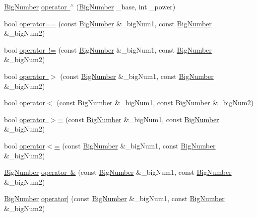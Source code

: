 \begin{DoxyCompactItemize}
\item 
\mbox{\hyperlink{class_big_nums_1_1_big_number}{Big\+Number}} \mbox{\hyperlink{namespace_big_nums_a26f4f7080ee4ac682138c92ad0ce7f75}{operator $^\wedge$}} (\mbox{\hyperlink{class_big_nums_1_1_big_number}{Big\+Number}} \+\_\+base, int \+\_\+power)
\item 
bool \mbox{\hyperlink{namespace_big_nums_a850a2334f2158f7bbe71d1c6e9fad531}{operator==}} (const \mbox{\hyperlink{class_big_nums_1_1_big_number}{Big\+Number}} \&\+\_\+big\+Num1, const \mbox{\hyperlink{class_big_nums_1_1_big_number}{Big\+Number}} \&\+\_\+big\+Num2)
\item 
bool \mbox{\hyperlink{namespace_big_nums_a4b4f66727acdbc37dadbf1da8170b088}{operator !=}} (const \mbox{\hyperlink{class_big_nums_1_1_big_number}{Big\+Number}} \&\+\_\+big\+Num1, const \mbox{\hyperlink{class_big_nums_1_1_big_number}{Big\+Number}} \&\+\_\+big\+Num2)
\item 
bool \mbox{\hyperlink{namespace_big_nums_a8da493ab5dba979579d6ceeec7b1ac14}{operator $>$}} (const \mbox{\hyperlink{class_big_nums_1_1_big_number}{Big\+Number}} \&\+\_\+big\+Num1, const \mbox{\hyperlink{class_big_nums_1_1_big_number}{Big\+Number}} \&\+\_\+big\+Num2)
\item 
bool \mbox{\hyperlink{namespace_big_nums_a3d130669f3794613ae13100178f0758c}{operator$<$}} (const \mbox{\hyperlink{class_big_nums_1_1_big_number}{Big\+Number}} \&\+\_\+big\+Num1, const \mbox{\hyperlink{class_big_nums_1_1_big_number}{Big\+Number}} \&\+\_\+big\+Num2)
\item 
bool \mbox{\hyperlink{namespace_big_nums_afde1be123ae1b999f1913f801d6aa286}{operator $>$=}} (const \mbox{\hyperlink{class_big_nums_1_1_big_number}{Big\+Number}} \&\+\_\+big\+Num1, const \mbox{\hyperlink{class_big_nums_1_1_big_number}{Big\+Number}} \&\+\_\+big\+Num2)
\item 
bool \mbox{\hyperlink{namespace_big_nums_a60e44068f20ee7b59d24f7147282eb2c}{operator$<$=}} (const \mbox{\hyperlink{class_big_nums_1_1_big_number}{Big\+Number}} \&\+\_\+big\+Num1, const \mbox{\hyperlink{class_big_nums_1_1_big_number}{Big\+Number}} \&\+\_\+big\+Num2)
\item 
\mbox{\hyperlink{class_big_nums_1_1_big_number}{Big\+Number}} \mbox{\hyperlink{namespace_big_nums_ab5839eac3b74ef69240811d21f09377c}{operator \&}} (const \mbox{\hyperlink{class_big_nums_1_1_big_number}{Big\+Number}} \&\+\_\+big\+Num1, const \mbox{\hyperlink{class_big_nums_1_1_big_number}{Big\+Number}} \&\+\_\+big\+Num2)
\item 
\mbox{\hyperlink{class_big_nums_1_1_big_number}{Big\+Number}} \mbox{\hyperlink{namespace_big_nums_a3885538e918c8cb0cd96433da09462f0}{operator$\vert$}} (const \mbox{\hyperlink{class_big_nums_1_1_big_number}{Big\+Number}} \&\+\_\+big\+Num1, const \mbox{\hyperlink{class_big_nums_1_1_big_number}{Big\+Number}} \&\+\_\+big\+Num2)

\end{DoxyCompactItemize}
